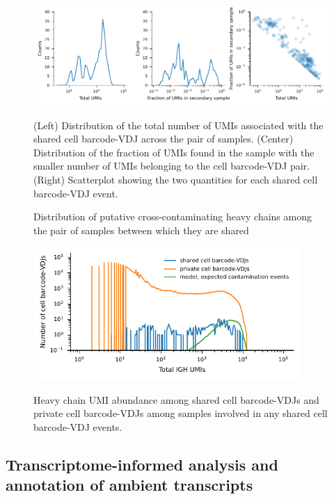\begin{figure}[t]
    \centering
    \includegraphics[width=\textwidth]{figs/Tabula_Bursa/SI/IGH_cross_contaminants_umi_ratio.pdf}
    \caption{Distribution of putative cross-contaminating heavy chains among the pair of samples between which they are shared}{(Left) Distribution of the total number of UMIs associated with the shared cell barcode-VDJ across the pair of samples. (Center) Distribution of the fraction of UMIs found in the sample with the smaller number of UMIs belonging to the cell barcode-VDJ pair. (Right) Scatterplot showing the two quantities for each shared cell barcode-VDJ event.}
    \label{fig:cross-contaminants-umi-ratio}
\end{figure}

\begin{figure}[t]
    \centering
    \includegraphics[width=4in]{figs/Tabula_Bursa/SI/IGH_cross_contaminants_vs_not_expression_with_pred.pdf}
    \caption{Heavy chain UMI abundance among shared cell barcode-VDJs and private cell barcode-VDJs among samples involved in any shared cell barcode-VDJ events.}{}
    \label{fig:cross-contaminants-umi-abundance}
\end{figure}

\subsection{Transcriptome-informed analysis and annotation of ambient transcripts}
\label{sec:GEX-VDJ-merge}
\noindent 

